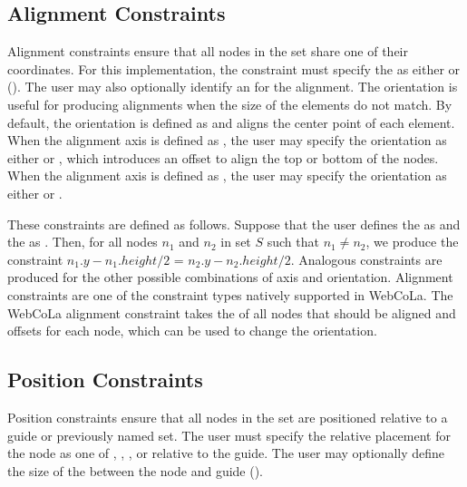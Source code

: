 \subsection{Alignment Constraints}
Alignment constraints ensure that all nodes in the set share one of their
coordinates. For this implementation, the constraint must specify the 
as either  or  ().
The user may also optionally identify an  for the alignment.
The orientation is useful for producing alignments when the size of the
elements do not match. By default, the orientation is defined as 
and aligns the center point of each element. When the alignment axis is defined as ,
the user may specify the orientation as either  or , which introduces
an offset to align the top or bottom of the nodes. When the alignment axis is 
defined as , the user may specify the orientation as either 
 or .

These constraints are defined as follows. Suppose that the user defines the 
as  and the  as .  Then, for all
nodes $n_1$ and $n_2$ in set $S$ such that $n_1 \neq n_2$, we produce the constraint
$n_1.y - n_1.height/2$ = $n_2.y - n_2.height/2$.
Analogous constraints are produced for the other possible combinations of axis and orientation.
Alignment constraints are one of the constraint types natively supported in
WebCoLa. The WebCoLa alignment constraint takes the  of all nodes
that should be aligned and offsets for each node, which can be used to change the orientation.

\subsection{Position Constraints}
Position constraints ensure that all nodes in the set are positioned relative to
a guide or previously named set. The user must specify the relative
placement for the node as one of , , 
, or  relative to the guide.
The user may optionally define the size of the 
between the node and guide ().

